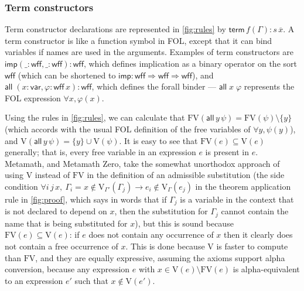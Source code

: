 \documentclass[runningheads]{llncs}
\begin{document}
\subsubsection{Term constructors}\label{sec:term}
Term constructor declarations are represented in \autoref{fig:rules} by $\mathsf{term}\,f(\Gamma):s\,\overline{x}$. A term constructor is like a  function symbol in FOL, except that it can bind variables if names are used in the arguments. Examples of term constructors are $\mathsf{imp}(\_:\mathsf{wff},\_:\mathsf{wff}):\mathsf{wff}$, which defines implication as a binary operator on the sort $\mathsf{wff}$ (which can be shortened to $\mathsf{imp}:\mathsf{wff}\Rightarrow\mathsf{wff}\Rightarrow \mathsf{wff}$), and $\mathsf{all}\;(x:\mathsf{var},\varphi:\mathsf{wff}\,x):\mathsf{wff}$, which defines the forall binder --- $\mathsf{all}\;x\;\varphi$ represents the FOL expression $\forall x,\varphi(x)$.

Using the rules in \autoref{fig:rules}, we can calculate that $\mathrm{FV}(\mathsf{all}\,y\,\psi)=\mathrm{FV}(\psi)\setminus\{y\}$ (which accords with the usual FOL definition of the free variables of $\forall y,\psi(y)$), and $\mathrm{V}(\mathsf{all}\,y\,\psi)=\{y\}\cup\mathrm{V}(\psi)$.  It is easy to see that $\mathrm{FV}(e)\subseteq \mathrm{V}(e)$ generally; that is, every free variable in an expression $e$ is present in $e$. Metamath, and Metamath Zero, take the somewhat unorthodox approach of using $\mathrm{V}$ instead of $\mathrm{FV}$ in the definition of an admissible substitution (the side condition $\forall i\,j\,x,\ \Gamma_i=x\notin\mathrm{V}_{\Gamma'}(\Gamma_j)\to e_i\notin \mathrm{V}_\Gamma(e_j)$ in the theorem application rule in \autoref{fig:proof}, which says in words that if $\Gamma_j$ is a variable in the context that is not declared to depend on $x$, then the substitution for $\Gamma_j$ cannot contain the name that is being substituted for $x$), but this is sound because $\mathrm{FV}(e)\subseteq \mathrm{V}(e)$: if $e$ does not contain any occurrence of $x$ then it clearly does not contain a free occurrence of $x$. This is done because $\mathrm{V}$ is faster to compute than $\mathrm{FV}$, and they are equally expressive, assuming the axioms support alpha conversion, because any expression $e$ with $x\in \mathrm{V}(e)\setminus\mathrm{FV}(e)$ is alpha-equivalent to an expression $e'$ such that $x\notin\mathrm{V}(e')$.
\end{document}
